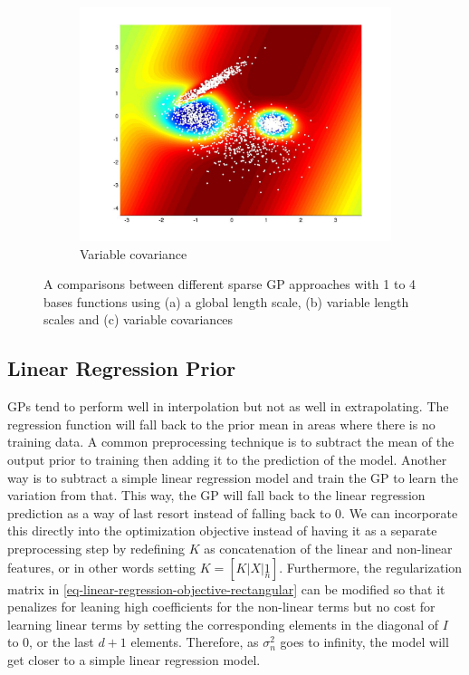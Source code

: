 \documentclass[useAMS,usenatbib,fleqn]{mn2e}
\begin{document}
\begin{figure}
\begin{subfigure}[b]{90 px}
                \includegraphics[trim = 150px 100px 150px 70px, clip=true,width=\textwidth]{VC4.jpg}
                \caption{Variable covariance}
        \end{subfigure}
               
        \caption{A comparisons between different sparse GP approaches with 1 to 4 bases functions using (a) a global length scale, (b) variable length scales and (c) variable covariances }
        \label{fig-toy-comparison}
\end{figure}

\subsection{Linear Regression Prior}

GPs tend to perform well in interpolation but not as well in extrapolating. The regression function will fall back to the prior mean in areas where there is no training data. A common preprocessing technique is to subtract the mean of the output prior to training then adding it to the prediction of the model. Another way is to subtract a simple linear regression model and train the GP to learn the variation from that. This way, the GP will fall back to the linear regression prediction as a way of last resort instead of falling back to 0. We can incorporate this directly into the optimization objective instead of having it as a separate preprocessing step by redefining $K$ as concatenation of the linear and non-linear features, or in other words setting $K=[K|X|\underset{n}{1}]$. Furthermore, the regularization matrix in \eqref{eq-linear-regression-objective-rectangular} can be modified so that it penalizes for leaning high coefficients for the non-linear terms but no cost for learning linear terms by setting the corresponding elements in the diagonal of $I$ to 0, or the last $d+1$ elements. Therefore, as $\sigma_{n}^{2}$ goes to infinity, the model will get closer to a simple linear regression model.
\end{document}

